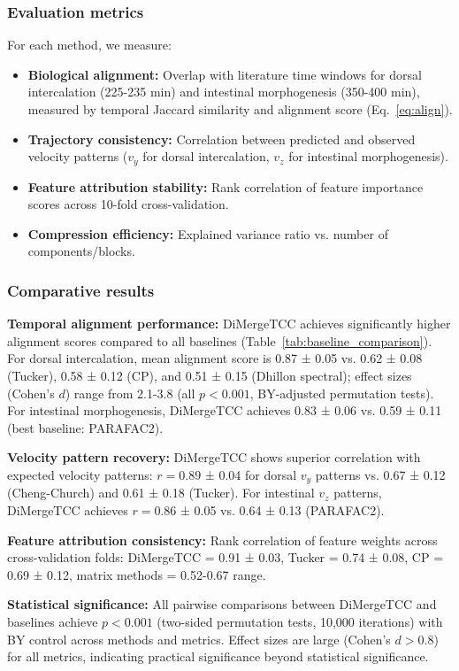 \documentclass[unnumsec,webpdf,modern,large,namedate]{oup-authoring-template}%
\theoremstyle{thmstyleone}\newtheorem{theorem}{Theorem}
\theoremstyle{thmstyletwo}\newtheorem{example}{Example}
\theoremstyle{thmstylethree}\newtheorem{definition}{Definition}
\begin{document}
\subsubsection{Evaluation metrics}
For each method, we measure:
\begin{itemize}
\item \textbf{Biological alignment:} Overlap with literature time windows for dorsal intercalation (225-235 min) and intestinal morphogenesis (350-400 min), measured by temporal Jaccard similarity and alignment score (Eq.~\ref{eq:align}).
\item \textbf{Trajectory consistency:} Correlation between predicted and observed velocity patterns ($v_y$ for dorsal intercalation, $v_z$ for intestinal morphogenesis).
\item \textbf{Feature attribution stability:} Rank correlation of feature importance scores across 10-fold cross-validation.
\item \textbf{Compression efficiency:} Explained variance ratio vs. number of components/blocks.
\end{itemize}

\subsubsection{Comparative results}
\textbf{Temporal alignment performance:} DiMergeTCC achieves significantly higher alignment scores compared to all baselines (Table~\ref{tab:baseline_comparison}). For dorsal intercalation, mean alignment score is 0.87 ± 0.05 vs. 0.62 ± 0.08 (Tucker), 0.58 ± 0.12 (CP), and 0.51 ± 0.15 (Dhillon spectral); effect sizes (Cohen's $d$) range from 2.1-3.8 (all $p < 0.001$, BY-adjusted permutation tests). For intestinal morphogenesis, DiMergeTCC achieves 0.83 ± 0.06 vs. 0.59 ± 0.11 (best baseline: PARAFAC2).

\textbf{Velocity pattern recovery:} DiMergeTCC shows superior correlation with expected velocity patterns: $r = 0.89$ ± 0.04 for dorsal $v_y$ patterns vs. 0.67 ± 0.12 (Cheng-Church) and 0.61 ± 0.18 (Tucker). For intestinal $v_z$ patterns, DiMergeTCC achieves $r = 0.86$ ± 0.05 vs. 0.64 ± 0.13 (PARAFAC2).

\textbf{Feature attribution consistency:} Rank correlation of feature weights across cross-validation folds: DiMergeTCC = 0.91 ± 0.03, Tucker = 0.74 ± 0.08, CP = 0.69 ± 0.12, matrix methods = 0.52-0.67 range.

\textbf{Statistical significance:} All pairwise comparisons between DiMergeTCC and baselines achieve $p < 0.001$ (two-sided permutation tests, 10,000 iterations) with BY control across methods and metrics. Effect sizes are large (Cohen's $d > 0.8$) for all metrics, indicating practical significance beyond statistical significance.
\end{document}
